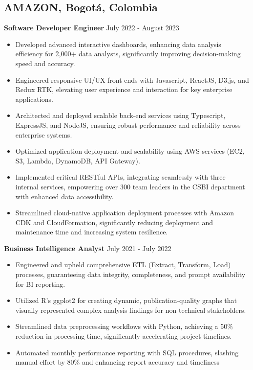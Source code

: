 \documentclass[10pt,a4paper]{article}
\begin{document}
\subsection*{AMAZON, Bogotá, Colombia}
\textbf{Software Developer Engineer} \hfill July 2022 - August 2023
\begin{itemize}[noitemsep]
    \item Developed advanced interactive dashboards, enhancing data analysis efficiency for 2,000+ data analysts, significantly improving decision-making speed and accuracy.
    \item Engineered responsive UI/UX front-ends with Javascript, ReactJS, D3.js, and Redux RTK, elevating user experience and interaction for key enterprise applications.
    \item Architected and deployed scalable back-end services using Typescript, ExpressJS, and NodeJS, ensuring robust performance and reliability across enterprise systems.
    \item Optimized application deployment and scalability using AWS services (EC2, S3, Lambda, DynamoDB, API Gateway).
    \item Implemented critical RESTful APIs, integrating seamlessly with three internal services, empowering over 300 team leaders in the CSBI department with enhanced data accessibility.
    \item Streamlined cloud-native application deployment processes with Amazon CDK and CloudFormation, significantly reducing deployment and maintenance time and increasing system resilience.
\end{itemize}

\textbf{Business Intelligence Analyst} \hfill July 2021 - July 2022
\begin{itemize}[noitemsep]
    \item Engineered and upheld comprehensive ETL (Extract, Transform, Load) processes, guaranteeing data integrity, completeness, and prompt availability for BI reporting.
    \item Utilized R's ggplot2 for creating dynamic, publication-quality graphs that visually represented complex analysis findings for non-technical stakeholders.
    \item Streamlined data preprocessing workflows with Python, achieving a 50\% reduction in processing time, significantly accelerating project timelines.
    \item Automated monthly performance reporting with SQL procedures, slashing manual effort by 80\% and enhancing report accuracy and timeliness
\end{itemize}
\end{document}
